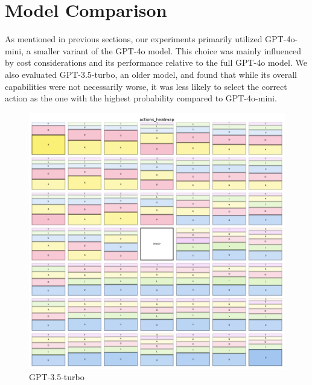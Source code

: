 \section{Model Comparison}
\label{sec:model_comparison}

As mentioned in previous sections, our experiments primarily utilized GPT-4o-mini,
a smaller variant of the GPT-4o model. This choice was mainly influenced by cost
considerations and its performance relative to the full GPT-4o model. We also evaluated
GPT-3.5-turbo, an older model, and found that while its overall capabilities were
not necessarily worse, it was less likely to select the correct action as the
one with the highest probability compared to GPT-4o-mini.

\begin{figure}[ht]
  \centering
  \begin{minipage}[b]{0.32\textwidth}
    \centering
    \includegraphics[width=\textwidth]{
      images/results_discussion/models/GPT3.5-turbo/actions_heatmap.png
    }
    \caption{GPT-3.5-turbo}
    \label{fig:models_gpt35}
  \end{minipage}
  \hfill
  \begin{minipage}[b]{0.32\textwidth}
    \centering

\end{minipage}
\end{figure}

